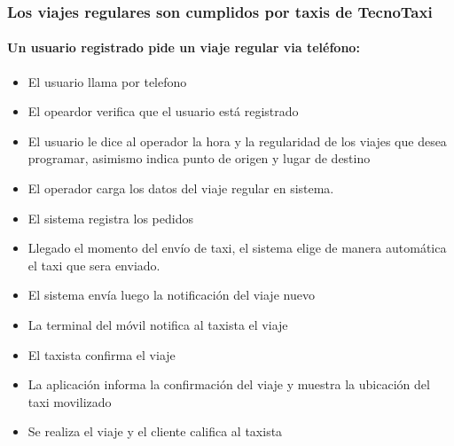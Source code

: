 \documentclass[a4paper]{article}
\begin{document}
\subsubsection{Los viajes regulares son cumplidos por taxis de TecnoTaxi}

\paragraph{Un usuario registrado pide un viaje regular via tel\'efono:}
\begin{itemize}
\item El usuario llama por telefono
\item El opeardor verifica que el usuario est\'a registrado
\item El usuario le dice al operador la hora y la regularidad de los viajes que desea programar, asimismo indica punto de origen y lugar de destino
\item El operador carga los datos del viaje regular en sistema.
\item El sistema registra los pedidos 
\item Llegado el momento del env\'io de taxi, el sistema elige de manera autom\'atica el taxi que sera enviado.
\item El sistema env\'ia luego la notificaci\'on del viaje nuevo
\item La terminal del m\'ovil notifica al taxista el viaje
\item El taxista confirma el viaje
\item La aplicaci\'on informa la confirmaci\'on del viaje y muestra la ubicaci\'on del taxi movilizado
\item Se realiza el viaje y el cliente califica al taxista
\end{itemize}
\end{document}
